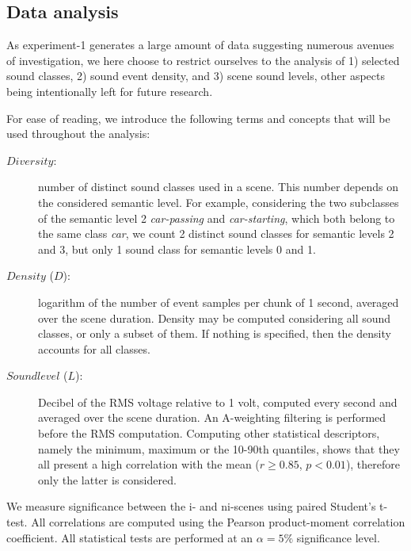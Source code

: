 \documentclass[twoside,twocolumn]{article}
\begin{document}
\subsection{Data analysis}

As experiment-1 generates a large amount of data suggesting numerous avenues of investigation, we here choose to restrict ourselves to the analysis of 1) selected sound classes, 2) sound event density, and 3) scene sound levels, other aspects being intentionally left for future research.

For ease of reading, we introduce the following terms and concepts that will be used throughout the analysis: 
\begin{description}
\item[$Diversity$:] number of distinct sound classes used in a scene. This number depends on the considered semantic level. For example, considering the two subclasses of the semantic level 2 \textit{car-passing} and \textit{car-starting}, which both belong to the same class \textit{car}, we count 2 distinct sound classes for semantic levels 2 and 3, but only 1 sound class for semantic levels 0 and 1. 
\item[$Density$ ($D$):] logarithm of the number of event samples per chunk of 1 second, averaged over the scene duration. Density may be computed considering all sound classes, or only a subset of them. If nothing is specified, then the density accounts for all classes.  
\item[$Sound level$ ($L$):]  Decibel of the RMS voltage relative to 1 volt, computed every second and averaged over the scene duration.   An A-weighting filtering is performed before the RMS computation. Computing other statistical descriptors, namely the minimum, maximum or the 10-90th quantiles, shows that they all present a high correlation with the mean ($r\geq0.85$, $p<0.01$), therefore only the latter is considered.
\end{description}

We measure significance between the i- and ni-scenes using paired Student's t-test. All correlations are computed using the Pearson product-moment correlation coefficient. All statistical tests are performed at an $\alpha=5\%$ significance level.
\end{document}
